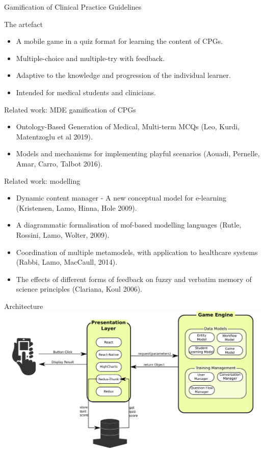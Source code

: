 \documentclass{beamer}
\begin{document}
\begin{frame}{Gamification of Clinical Practice Guidelines}
\begin{block}{The artefact}
	\begin{itemize}
		\item A mobile game in a quiz format for learning the content of CPGs.
		\item Multiple-choice and multiple-try with feedback.
		\item Adaptive to the knowledge and progression of the individual learner.
		\item Intended for medical students and clinicians.
	\end{itemize}
\end{block}
\end{frame}

\begin{frame}{Related work: MDE gamification of CPGs}
\begin{itemize}
	\item Ontology-Based Generation of Medical, Multi-term MCQs (Leo, Kurdi, Matentzoglu et al 2019).
	\item Models and mechanisms for implementing playful scenarios (Aouadi, Pernelle, Amar, Carro, Talbot 2016).
\end{itemize}
\end{frame}

\begin{frame}{Related work: modelling}
\begin{itemize}
	\item Dynamic content manager - A new conceptual model for e-learning (Kristensen, Lamo, Hinna, Hole 2009).
	\item A	diagrammatic formalisation of mof-based modelling languages (Rutle, Rossini, Lamo, Wolter, 2009).
	\item Coordination of multiple metamodels, with application to healthcare systems (Rabbi, Lamo, MacCaull, 2014).
	\item The effects of different forms of	feedback on fuzzy and verbatim memory of science principles (Clariana, Koul 2006).
\end{itemize}
\end{frame}

\begin{frame}{Architecture}
\includegraphics[scale=0.35]{Architecture}
\end{frame}
\end{document}
